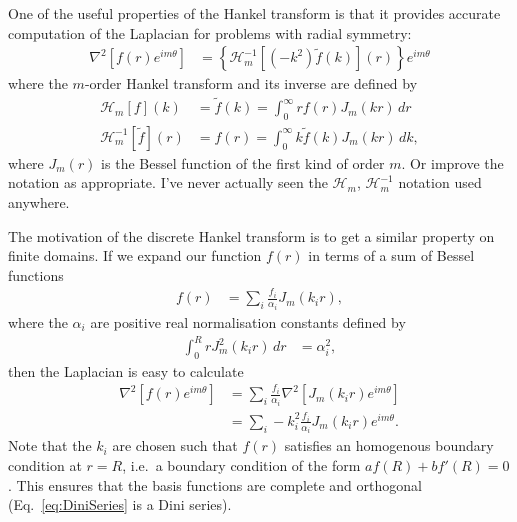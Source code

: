 \documentclass[aip,amsmath,amssymb,reprint,twocolumn]{revtex4-1}
\begin{document}
One of the useful properties of the Hankel transform is that it provides accurate computation of the Laplacian for problems with radial symmetry:
\begin{align}
  \nabla^2 \left[f(r) e^{i m \theta}\right] &= \left\{\mathcal{H}^{-1}_m\left[(-k^2)\tilde{f}(k)\right](r)\right\}e^{i m \theta}
\end{align}
where the $m$-order Hankel transform and its inverse are defined by
\begin{align}
  \mathcal{H}_m[f](k) &= \tilde{f}(k) = \int_0^{\infty} r f(r) J_m(k r) \, dr \label{eq:HankelTransform}\\
  \mathcal{H}^{-1}_m[\tilde{f}](r) &= f(r) = \int_0^{\infty} k \tilde{f}(k) J_m(k r)\, dk, \label{eq:InverseHankelTransform} 
\end{align}
where $J_m(r)$ is the Bessel function of the first kind of order $m$. Or improve the notation as appropriate.  I've never actually seen the $\mathcal{H}_m$, $\mathcal{H}^{-1}_m$ notation used anywhere.

The motivation of the discrete Hankel transform is to get a similar property on finite domains.  If we expand our function $f(r)$ in terms of a sum of Bessel functions
\begin{align}
  f(r) &= \sum_i \frac{f_i}{\alpha_i} J_m(k_i r), \label{eq:DiniSeries}
\end{align}
where the $\alpha_i$ are positive real normalisation constants defined by
\begin{align}
  \int_0^R r J_m^2(k_i r)\, dr &= \alpha_i^2, \label{eq:AlphaNormalisation}
\end{align}
then the Laplacian is easy to calculate
\begin{align}
  \nabla^2\left[f(r) e^{i m \theta}\right] &= \sum_i \frac{f_i}{\alpha_i} \nabla^2\left[J_m(k_i r) e^{i m \theta}\right] \\
  &= \sum_i - k_i^2 \frac{f_i}{\alpha_i} J_m(k_i r) e^{i m \theta}.
\end{align}
Note that the $k_i$ are chosen such that $f(r)$ satisfies an homogenous boundary condition at $r=R$, i.e.\ a boundary condition of the form $a f(R) + b f'(R) = 0$.  This ensures that the basis functions are complete and orthogonal (Eq.~\eqref{eq:DiniSeries} is a Dini series\citep{Watson:1966}).
\end{document}
